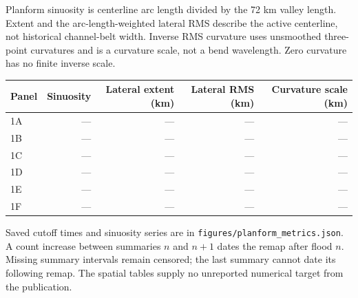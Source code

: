 Planform sinuosity is centerline arc length divided by the 72 km valley length. Extent and the arc-length-weighted lateral RMS describe the active centerline, not historical channel-belt width. Inverse RMS curvature uses unsmoothed three-point curvatures and is a curvature scale, not a bend wavelength. Zero curvature has no finite inverse scale.\par
\begin{center}\small\begin{tabular}{lrrrr}\toprule
Panel & Sinuosity & Lateral extent (km) & Lateral RMS (km) & Curvature scale (km) \\ \midrule
1A & --- & --- & --- & --- \\
1B & --- & --- & --- & --- \\
1C & --- & --- & --- & --- \\
1D & --- & --- & --- & --- \\
1E & --- & --- & --- & --- \\
1F & --- & --- & --- & --- \\
\bottomrule\end{tabular}\end{center}
Saved cutoff times and sinuosity series are in \texttt{figures/\allowbreak{}planform\_\allowbreak{}metrics.json}. A count increase between summaries $n$ and $n+1$ dates the remap after flood $n$. Missing summary intervals remain censored; the last summary cannot date its following remap. The spatial tables supply no unreported numerical target from the publication.
